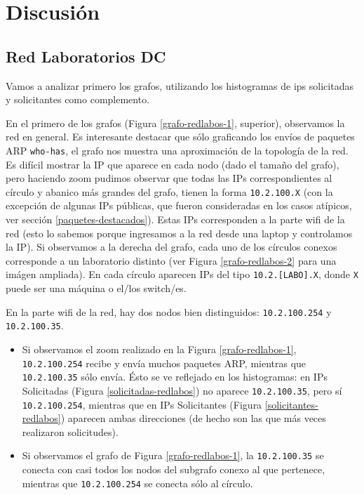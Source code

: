 \section{Discusión}

\subsection{Red Laboratorios DC}

Vamos a analizar primero los grafos, utilizando los histogramas de ips solicitadas y solicitantes como complemento.

En el primero de los grafos (Figura \ref{grafo-redlabos-1}, superior), observamos la red en general. Es interesante destacar que sólo graficando los
envíos de paquetes ARP {\tt who-has}, el grafo nos muestra una aproximación de la topología de la red. Es difícil mostrar la IP que aparece en cada nodo 
(dado el tamaño del grafo), pero haciendo zoom pudimos observar que todas las IPs correspondientes al círculo y abanico  más grandes del grafo, tienen
la forma {\tt 10.2.100.X} (con la excepción de algunas IPs públicas, que fueron consideradas en los casos atípicos, ver sección \ref{paquetes-destacados}).
Estas IPs corresponden a la parte wifi de la red (esto lo sabemos porque ingresamos a la red desde una laptop y controlamos la IP). Si observamos a la
derecha del grafo, cada uno de los círculos conexos corresponde a un laboratorio distinto (ver Figura \ref{grafo-redlabos-2} para una imágen ampliada).
En cada círculo aparecen IPs del tipo {\tt 10.2.[LABO].X}, donde {\tt X} puede ser una máquina o el/los switch/es.

En la parte wifi de la red, hay dos nodos bien distinguidos: {\tt 10.2.100.254} y {\tt 10.2.100.35}.
\begin{itemize}
 \item Si observamos el zoom realizado en la Figura 
\ref{grafo-redlabos-1}, {\tt 10.2.100.254} recibe y envía muchos paquetes ARP, mientras que {\tt 10.2.100.35} sólo envía. Ésto se ve reflejado en los
histogramas: en IPs Solicitadas (Figura \ref{solicitadas-redlabos}) no aparece {\tt 10.2.100.35}, pero sí {\tt 10.2.100.254}, mientras que en
IPs Solicitantes (Figura \ref{solicitantes-redlabos}) aparecen ambas direcciones (de hecho son las que más veces realizaron solicitudes).
\item Si observamos el grafo de Figura \ref{grafo-redlabos-1}, la {\tt 10.2.100.35} se conecta con casi todos los nodos del subgrafo conexo al que pertenece,
mientras que {\tt 10.2.100.254} se conecta sólo al círculo.
\end{itemize}

